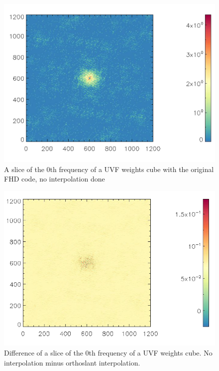 \documentclass[linenumbers]{aastex631}
\begin{document}
\begin{figure}[h!]
    \centering
    \includegraphics[scale=.2]{my run}
    \caption{A slice of the 0th frequency of a UVF weights cube with the original FHD code, no interpolation done}
    \label{fig:orig}
\end{figure}

\begin{figure}[h!]
    \centering
    \includegraphics[scale=.7]{Screen Shot 2020-11-19 at 12.09.49 PM (1).png}
    \caption{Difference of a slice of the 0th frequency of a UVF weights cube.  No interpolation minus orthoslant interpolation.}
    \label{fig:diff}
\end{figure}
\end{document}
